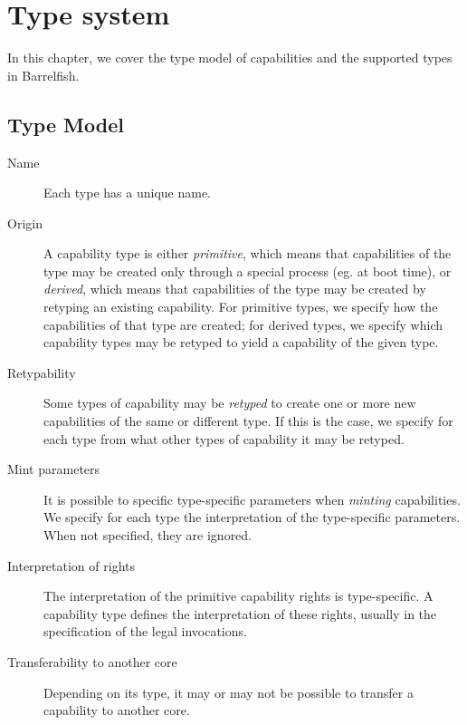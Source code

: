 \chapter{Type system}\label{chap:type_system}

In this chapter, we cover the type model of capabilities and the
supported types in Barrelfish.

\section{Type Model}
    
\begin{description}
\item[Name] Each type has a unique name.

\item[Origin] A capability type is either \emph{primitive}, which
  means that capabilities of the type may be created only through a
  special process (eg. at boot time), or \emph{derived}, which means
  that capabilities of the type may be created by retyping an existing
  capability. For primitive types, we specify how the capabilities of
  that type are created; for derived types, we specify which
  capability types may be retyped to yield a capability of the given
  type.

\item[Retypability] Some types of capability may be \emph{retyped} to
  create one or more new capabilities of the same or different
  type. If this is the case, we specify for each type from what other types of
  capability it may be retyped.

\item[Mint parameters] It is possible to specific type-specific
  parameters when \emph{minting} capabilities. We specify for each
  type the interpretation of the type-specific parameters. When not
  specified, they are ignored.

\item[Interpretation of rights] The interpretation of the primitive
  capability rights is type-specific. A capability type defines the
  interpretation of these rights, usually in the specification of the
  legal invocations.

\item[Transferability to another core] Depending on its type, it may
  or may not be possible to transfer a capability to another core.


\end{description}
